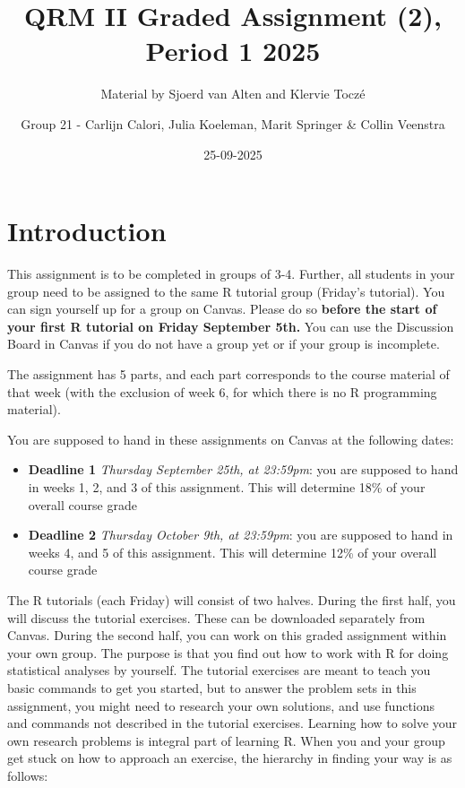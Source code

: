 \documentclass[
]{article}
\title{QRM II Graded Assignment (2), Period 1 2025}
\subtitle{Material by Sjoerd van Alten and Klervie Toczé}
\author{Group 21 - Carlijn Calori, Julia Koeleman, Marit Springer \&
Collin Veenstra}
\date{25-09-2025}
\providecommand{\tightlist}{%
  \setlength{\itemsep}{0pt}\setlength{\parskip}{0pt}}
\begin{document}
\maketitle

\section{Introduction}\label{introduction}

This assignment is to be completed in groups of 3-4. Further, all
students in your group need to be assigned to the same R tutorial group
(Friday's tutorial). You can sign yourself up for a group on Canvas.
Please do so
\textbf{before the start of your first R tutorial on Friday September 5th.}
You can use the Discussion Board in Canvas if you do not have a group
yet or if your group is incomplete.

The assignment has 5 parts, and each part corresponds to the course
material of that week (with the exclusion of week 6, for which there is
no R programming material).

You are supposed to hand in these assignments on Canvas at the following
dates:

\begin{itemize}
\tightlist
\item
  \textbf{Deadline 1} \emph{Thursday September 25th, at 23:59pm}: you
  are supposed to hand in weeks 1, 2, and 3 of this assignment. This
  will determine 18\% of your overall course grade
\item
  \textbf{Deadline 2} \emph{Thursday October 9th, at 23:59pm}: you are
  supposed to hand in weeks 4, and 5 of this assignment. This will
  determine 12\% of your overall course grade
\end{itemize}

The R tutorials (each Friday) will consist of two halves. During the
first half, you will discuss the tutorial exercises. These can be
downloaded separately from Canvas. During the second half, you can work
on this graded assignment within your own group. The purpose is that you
find out how to work with R for doing statistical analyses by yourself.
The tutorial exercises are meant to teach you basic commands to get you
started, but to answer the problem sets in this assignment, you might
need to research your own solutions, and use functions and commands not
described in the tutorial exercises. Learning how to solve your own
research problems is integral part of learning R. When you and your
group get stuck on how to approach an exercise, the hierarchy in finding
your way is as follows:
\end{document}
